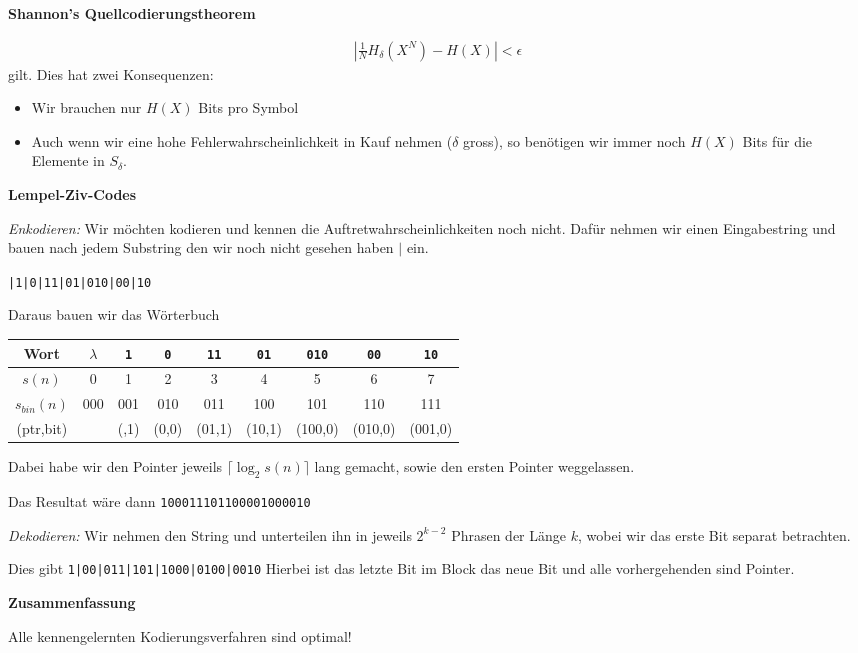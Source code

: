 \documentclass[25pt]{sciposter}
\newenvironment{defn}[1]{\begin{mdframed}[backgroundcolor=blue!10,innertopmargin=15pt, nobreak=true,innerbottommargin=15pt]
		\textbf{#1 }
	}
	{ 
	\end{mdframed}
}
\newenvironment{thm}[1]{\begin{mdframed}[nobreak=true,backgroundcolor=Emerald!10,innertopmargin=15pt, innerbottommargin=15pt]
		\textbf{#1 }
	}
	{ 
	\end{mdframed}
}
\begin{document}
\begin{multicols}{3}
\begin{thm}{Shannon's Quellcodierungstheorem}
	\begin{align*}
\left|\frac{1}{N} H_{\delta} (X^N) - H(X) \right| < \epsilon
	\end{align*}
gilt. Dies hat zwei Konsequenzen:

\begin{itemize}
	\item Wir brauchen nur $H(X)$ Bits pro Symbol
	\item Auch wenn wir eine hohe Fehlerwahrscheinlichkeit in Kauf nehmen ($\delta$ gross), so benötigen wir immer noch $H(X)$ Bits für die Elemente in $S_\delta$.
\end{itemize}

\end{thm}



\begin{defn}{Lempel-Ziv-Codes}
	\textit{Enkodieren:}	Wir möchten kodieren und kennen die Auftretwahrscheinlichkeiten noch nicht. Dafür nehmen wir einen Eingabestring und bauen nach jedem Substring den wir noch nicht gesehen haben $|$ ein.
	
	\texttt{|1|0|11|01|010|00|10}
	
	Daraus bauen wir das Wörterbuch
	
{
	\begin{tabular}{|c|c|c|c|c|c|c|c|c|}
	\hline
	Wort & $\lambda$ & \texttt{1} & \texttt{0}  & \texttt{11} & \texttt{01} & \texttt{010} & \texttt{00} & \texttt{10} \\
	\hline
	$s(n)$& 0 & 1 & 2 & 3 & 4 & 5 & 6 & 7 \\
	\hline
	 $s_{bin}(n)$ & 000 & 001 & 010 & 011 & 100 & 101 & 110 & 111 \\
	\hline
	(ptr,bit) & & (,1) & (0,0) & (01,1) & (10,1) & (100,0) & (010,0) & (001,0)\\ 
	\hline
\end{tabular}}
Dabei habe wir den Pointer jeweils $\lceil \log_2 s(n) \rceil$ lang gemacht, sowie den ersten Pointer weggelassen.

Das Resultat wäre dann \texttt{100011101100001000010}


\textit{Dekodieren:} Wir nehmen den String und unterteilen ihn in jeweils $2^{k-2}$ Phrasen der Länge $k$, wobei wir das erste Bit separat betrachten.

Dies gibt \texttt{1|00|011|101|1000|0100|0010}
Hierbei ist das letzte Bit im Block das neue Bit und alle vorhergehenden sind Pointer.
\end{defn}

\textbf{Zusammenfassung}

Alle kennengelernten Kodierungsverfahren sind optimal!




\newpage

\end{multicols}
\end{document}
